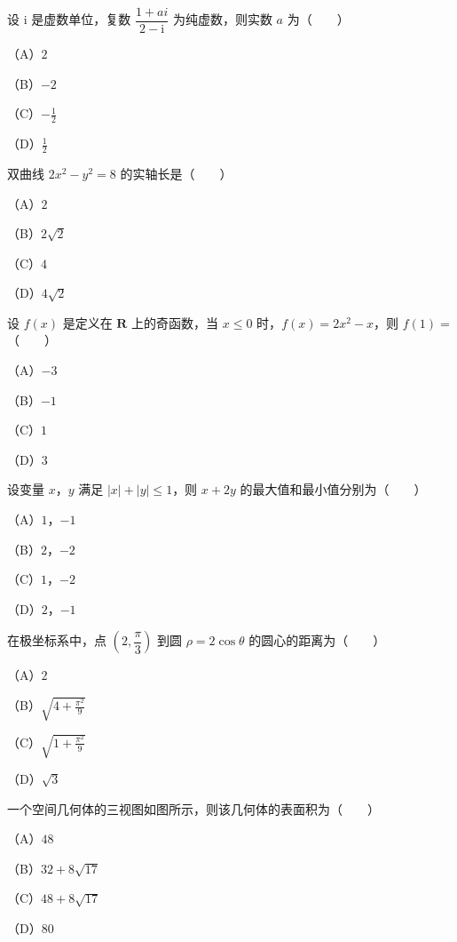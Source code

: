 \begin{question}
设 $\mathrm i$ 是虚数单位，复数 $\dfrac{1+ai}{2-\mathrm i}$ 为纯虚数，则实数 $a$ 为\mbox{（　　）}

（A）$2$

（B）$-2$

（C）$-\frac12$

（D）$\frac12$

\end{question}
\begin{question}
双曲线 $2x^2-y^2=8$ 的实轴长是\mbox{（　　）}

（A）$2$

（B）$2\sqrt2$

（C）$4$

（D）$4\sqrt2$

\end{question}
\begin{question}
设 $f(x)$ 是定义在 $\mathbf R$ 上的奇函数，当 $x\leqslant 0$ 时，$f(x)=2x^2-x$，则 $f(1)=$\mbox{（　　）}

（A）$-3$

（B）$-1$

（C）$1$

（D）$3$

\end{question}
\begin{question}
设变量 $x$，$y$ 满足 $|x|+|y|\leqslant 1$，则 $x+2y$ 的最大值和最小值分别为\mbox{（　　）}

（A）$1$，$-1$

（B）$2$，$-2$

（C）$1$，$-2$

（D）$2$，$-1$

\end{question}
\begin{question}
在极坐标系中，点 $\left(2,\dfrac{\pi}{3}\right)$ 到圆 $\rho=2\cos\theta$ 的圆心的距离为\mbox{（　　）}

（A）$2$

（B）$\sqrt{4+\frac{\pi^2}{9}}$

（C）$\sqrt{1+\frac{\pi^2}{9}}$

（D）$\sqrt3$

\Needspace{0.4\textheight}
\end{question}
\begin{question}
一个空间几何体的三视图如图所示，则该几何体的表面积为\mbox{（　　）}

（A）$48$

（B）$32+8\sqrt{17}$

（C）$48+8\sqrt{17}$

（D）$80$
\nopagebreak[4]
\begin{center}\end{center}
\nopagebreak[4]
\end{question}
